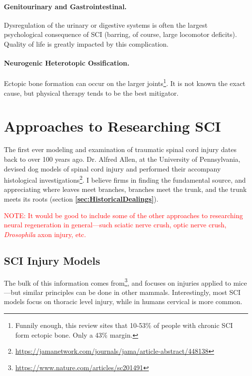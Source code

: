 \subsubsection{Genitourinary and Gastrointestinal.}
Dysregulation of the urinary or digestive systems is often the largest psychological consequence of SCI (barring, of course, large locomotor deficits). Quality of life is greatly impacted by this complication. 

\subsubsection{Neurogenic Heterotopic Ossification.}
Ectopic bone formation can occur on the larger joints\footnote{Funnily enough, this review sites that 10-53\% of people with chronic SCI form ectopic bone. Only a 43\% margin.}. It is not known the exact cause, but physical therapy tends to be the best mitigator. 




\chapter{Approaches to Researching SCI}

The first ever modeling and examination of traumatic spinal cord injury dates back to over 100 years ago. Dr. Alfred Allen, at the University of Pennsylvania, devised dog models of spinal cord injury and performed their accompany histological investigations\footnote{\url{https://jamanetwork.com/journals/jama/article-abstract/448138}}. I believe firms in finding the fundamental source, and appreciating where leaves meet branches, branches meet the trunk, and the trunk meets its roots (section \textbf{\ref{sec:HistoricalDealings}}).\newline

\textcolor{red}{NOTE: It would be good to include some of the other approaches to researching neural regeneration in general---such sciatic nerve crush, optic nerve crush, \textit{Drosophila} axon injury, etc.}

\section{SCI Injury Models}
The bulk of this information comes from\footnote{\url{https://www.nature.com/articles/sc201491}}, and focuses on injuries applied to mice---but similar principles can be done in other mammals. Interestingly, most SCI models focus on thoracic level injury, while in humans cervical is more common. 

